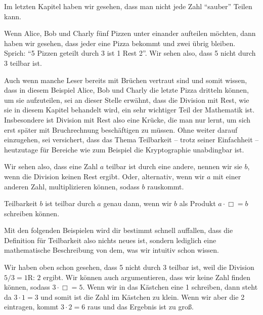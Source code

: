 \documentclass[../../main.tex]{subfiles}
\begin{document}
Im letzten Kapitel haben wir gesehen, dass man nicht jede Zahl \enquote{sauber} Teilen kann.
\begin{example}{}
	Wenn Alice, Bob und Charly fünf Pizzen unter einander aufteilen möchten, dann haben wir gesehen, dass jeder eine
	Pizza bekommt und zwei übrig bleiben. Sprich: \enquote{5 Pizzen geteilt durch 3 ist 1 Rest 2}. Wir sehen also, dass
	5 nicht durch 3 teilbar ist.
\end{example}

\begin{remark}{}
	Auch wenn manche Leser bereits mit Brüchen vertraut sind und somit wissen, dass in diesem Beispiel Alice, Bob und
	Charly die letzte Pizza dritteln können, um sie aufzuteilen, sei an dieser Stelle erwähnt, dass die Division mit
	Rest, wie sie in diesem Kapitel behandelt wird, ein sehr wichtiger Teil der Mathematik ist. Insbesondere ist
	Division mit Rest also eine Krücke, die man nur lernt, um sich erst später mit Bruchrechnung beschäftigen zu müssen.
	Ohne weiter darauf einzugehen, sei versichert, dass das Thema Teilbarkeit -- trotz seiner Einfachheit -- heutzutage
	für Bereiche wie zum Beispiel die Kryptographie unabdingbar ist.
\end{remark}

Wir sehen also, dass eine Zahl $a$ teilbar ist durch eine andere, nennen wir sie $b$, wenn die Division keinen Rest
ergibt. Oder, alternativ, wenn wir $a$ mit einer anderen Zahl, multiplizieren können, sodass $b$ rauskommt.

\begin{definition}{Teilbarkeit}
	$b$ ist teilbar durch $a$ genau dann, wenn wir $b$ als Produkt $a\cdot \Box = b$ schreiben können.
\end{definition}

Mit den folgenden Beispielen wird dir bestimmt schnell auffallen, dass die Definition für Teilbarkeit also nichts neues
ist, sondern lediglich eine mathematische Beschreibung von dem, was wir intuitiv schon wissen.

\begin{example}{}
	Wir haben oben schon gesehen, dass 5 nicht durch 3 teilbar ist, weil die Division $5/3 = 1 \text{R: }2$ ergibt. Wir
	können auch argumentieren, dass wir keine Zahl finden können, sodass $3\cdot \Box = 5$. Wenn wir in das Kästchen
	eine 1 schreiben, dann steht da $3\cdot 1 = 3$ und somit ist die Zahl im Kästchen zu klein. Wenn wir aber die 2
	eintragen, kommt $3\cdot 2 = 6$ raus und das Ergebnis ist zu groß.
\end{example}
\end{document}

